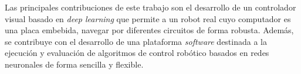 Las principales contribuciones de este trabajo son el desarrollo de un controlador visual basado en \textit{deep learning} que permite a un robot real cuyo computador es una placa embebida, navegar por diferentes circuitos de forma robusta. Además, se contribuye con el desarrollo de una plataforma \textit{software} destinada a la ejecución y evaluación de algoritmos de control robótico basados en redes neuronales de forma sencilla y flexible.





\newpage				%
\thispagestyle{empty}
\mbox{}